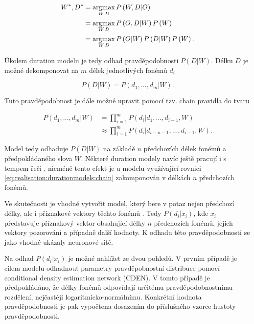 \begin{align}
  W^{*}, D^{*} &= \operatorname*{argmax}_{W, D} P\left(W, D| O\right) \nonumber  \\
          &= \operatorname*{argmax}_{W, D} P\left(O, D| W\right)P\left(W\right) \nonumber  \\
          &= \operatorname*{argmax}_{W, D} P\left(O|W\right)P\left(D|W\right)P\left(W\right).
  \label{eq:realisation:durationmodels:assumtion}
\end{align}

\noindent Úkolem duration modelu je tedy odhad pravděpodobnosti $P\left(D|W\right)$. Délku $D$ je možné dekomponovat na $m$ délek jednotlivých fonémů $d_{i}$

\begin{equation}
  P\left(D | W\right) = P\left(d_{1}, \dots, d_{m}|W\right).
  \label{eq:realisation:durationmodels:decomposition}
\end{equation}

\noindent Tuto pravděpodobnost je dále možné upravit pomocí tzv. chain pravidla do tvaru

\begin{align}
  P\left(d_{1}, \dots, d_{m} | W\right) &= \prod_{i=1}^{m} P\left(d_{i} | d_{1}, \dots, d_{i-1}, W\right) \nonumber \\
        &\approx \prod_{i=1}^{m} P\left(d_{i} | d_{i-n-1}, \dots, d_{i-1}, W\right).
  \label{eq:realisation:durationmodels:chain}
\end{align}

\noindent Model tedy odhaduje $P\left(D|W\right)$ na základě $n$ předchozích délek fonémů a předpokládaného slova $W$. Některé duration modely navíc ještě pracují i s tempem řeči \cite{Pylkkonen2004}, nicméně tento efekt je u modelu využívající rovnici \ref{eq:realisation:durationmodels:chain} zakomponován v délkách $n$ předchozích fonémů.

Ve skutečnosti je vhodné vytvořit model, který bere v potaz nejen předchozí délky, ale i příznakové vektory těchto fonémů \cite{Alumae2014}. Tedy $P\left(d_{i}|x_{i}\right)$, kde $x_{i}$ představuje příznakový vektor obsahující délky $n$ předchozích fonémů, jejich vektory pozorování a případně další hodnoty. K odhadu této pravděpodobnosti se jako vhodné ukázaly neuronové sítě. \cite{Alumae2014} \cite{Hadian2017}

Na odhad $P\left(d_{i}|x_{i}\right)$ je možné nahlížet ze dvou pohledů. V prvním případě je cílem modelu odhadnout parametry pravděpobnostní distribuce pomocí conditional density estimation network (CDEN). \cite{Alumae2014} V tomto případě je předpokládáno, že délky fonémů odpovídají určitému pravděpodobnostnímu rozdělení, nejčastěji logaritmicko-normálnímu. Konkrétní hodnota pravděpodobnosti je pak vypočtena dosazením do příslušného vzorce hustoty pravděpodobnosti.


